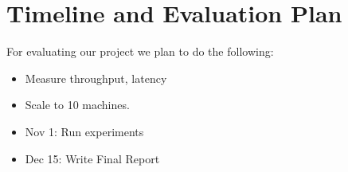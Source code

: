 \documentclass[pdftex,twocolumn,10pt,letterpaper]{article}
\begin{document}
\section{Timeline and Evaluation Plan}
For evaluating our project we plan to do the following:
\begin{itemize}
  \item Measure throughput, latency 
  \item Scale to 10 machines.
\end{itemize}

\begin{itemize}
  \item Nov 1: Run experiments 
  \item Dec 15: Write Final Report
\end{itemize}

{


}
\end{document}
